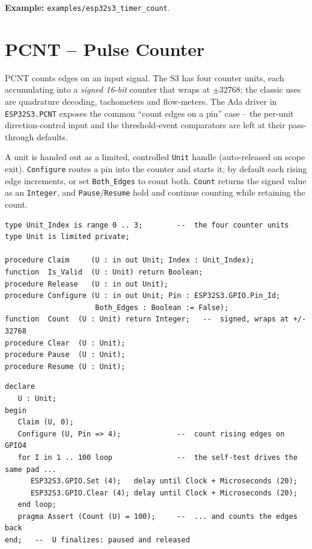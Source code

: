 \noindent\textbf{Example:} \texttt{examples/esp32s3\_timer\_count}.

\section{PCNT -- Pulse Counter}
\label{app:int:pcnt}

PCNT counts edges on an input signal. The S3 has four counter units, each
accumulating into a \emph{signed 16-bit} counter that wraps at $\pm 32768$; the
classic uses are quadrature decoding, tachometers and flow-meters. The Ada driver
in \texttt{ESP32S3.PCNT} exposes the common ``count edges on a pin'' case -- the
per-unit direction-control input and the threshold-event comparators are left at
their pass-through defaults.

A unit is handed out as a limited, controlled \texttt{Unit} handle (auto-released
on scope exit). \texttt{Configure} routes a pin into the counter and starts it; by
default each rising edge increments, or set \texttt{Both\_Edges} to count both.
\texttt{Count} returns the signed value as an \texttt{Integer}, and
\texttt{Pause}/\texttt{Resume} hold and continue counting while retaining the
count.

\begin{lstlisting}
type Unit_Index is range 0 .. 3;        --  the four counter units
type Unit is limited private;

procedure Claim     (U : in out Unit; Index : Unit_Index);
function  Is_Valid  (U : Unit) return Boolean;
procedure Release   (U : in out Unit);
procedure Configure (U : in out Unit; Pin : ESP32S3.GPIO.Pin_Id;
                     Both_Edges : Boolean := False);
function  Count  (U : Unit) return Integer;   --  signed, wraps at +/- 32768
procedure Clear  (U : Unit);
procedure Pause  (U : Unit);
procedure Resume (U : Unit);
\end{lstlisting}

\begin{lstlisting}
declare
   U : Unit;
begin
   Claim (U, 0);
   Configure (U, Pin => 4);             --  count rising edges on GPIO4
   for I in 1 .. 100 loop               --  the self-test drives the same pad ...
      ESP32S3.GPIO.Set (4);   delay until Clock + Microseconds (20);
      ESP32S3.GPIO.Clear (4); delay until Clock + Microseconds (20);
   end loop;
   pragma Assert (Count (U) = 100);     --  ... and counts the edges back
end;   --  U finalizes: paused and released
\end{lstlisting}

